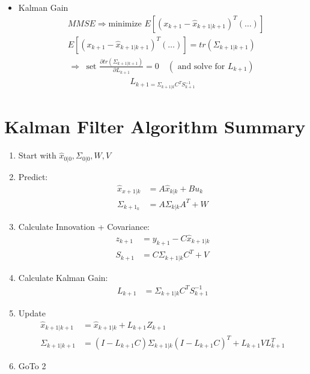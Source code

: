 \documentclass[11pt]{article}
\begin{document}
\begin{itemize}
       \item Kalman Gain
       \begin{align*}
           &MMSE \Rightarrow \text{minimize } E[(x_{k+1}-\hat{x}_{k+1|k+1})^T(\dots)]
           \\
           &E[(x_{k+1}-\hat{x}_{k+1|k+1})^T(\dots)] = tr\left(\Sigma_{k+1|k+1}\right)
       \end{align*}
       \begin{align*}
           \Rightarrow & \text{set }\frac{\partial tr(\Sigma_{k+1|k+1})}{\partial L_{k+1}}= 0 \quad(\text{ and solve for }L_{k+1})
       \end{align*}
       \begin{align*}
           \boxed{L_{k+1 = \Sigma_{k+1|k}C^TS_{k+1}^{-1}}}
       \end{align*}
\end{itemize}

\section{Kalman Filter Algorithm Summary}
\begin{enumerate}
    \item Start with $\hat{x}_{0|0}, \Sigma_{0|0}, W, V$
    \item Predict:
    \begin{align*}
        \hat{x}_{x+1|k} &= A\hat{x}_{k|k} + Bu_k
        \\
        \Sigma_{k+1_k} &= A\Sigma_{k|k}A^T + W
    \end{align*}
    \item Calculate Innovation + Covariance:
    \begin{align*}
        z_{k+1} &= y_{k+1} - C\hat{x}_{k+1|k}
        \\
        S_{k+1} &= C\Sigma_{k+1|k} C^T + V
    \end{align*}
    \item Calculate Kalman Gain:
    \begin{align*}
        L_{k+1} &= \Sigma_{k+1|k} C^TS_{k+1}^{-1}
    \end{align*}
    \item Update
    \begin{align*}
        \hat{x}_{k+1|k+1} &= \hat{x}_{k+1|k} + L_{k+1}Z_{k+1} \\
        \Sigma_{k+1|k+1} &= (I-L_{k+1}C)\Sigma_{k+1|k}(I-L_{k+1}C)^T + L_{k+1}VL_{k+1}^T
    \end{align*}
    \item GoTo 2
\end{enumerate}
\end{document}
